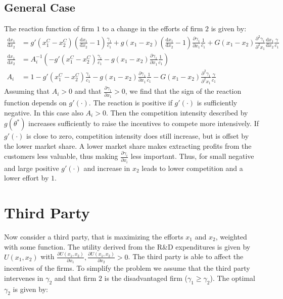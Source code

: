 \documentclass[a4paper, 11pt]{article}
\renewcommand{\d}{\text{d}}
\begin{document}
\subsection{General Case}
The reaction function of firm $1$ to a change in the efforts of firm $2$ is given by:
\begin{align}
\frac{\d x_1}{\d x_2} &= g'(x_1^C-x_2^C)\left(\frac{\d x_1}{\d x_2}-1\right)\frac{\gamma_1}{c_1} + g(x_1-x_2)\left(\frac{\d x_1}{\d x_2}-1\right)\frac{\partial \gamma_1}{\partial x_1}\frac{1}{c_1} + G(x_1-x_2)\frac{\partial^2 \gamma_1}{\partial^2 x_1}\frac{\d x_1}{\d x_2}\frac{\gamma}{c_1}\\
\frac{\d x_1}{\d x_2} &= A_i^{-1} \left(-g'(x_1^C-x_2^C)\frac{\gamma_1}{c_1} - g(x_1-x_2)\frac{\partial \gamma_1}{\partial x_1}\frac{1}{c_1}\right)\\
A_i &= 1 - g'(x_1^C-x_2^C)\frac{\gamma_1}{c_1}-g(x_1-x_2)\frac{\partial \gamma_1}{\partial x_1}\frac{1}{c_1}-G(x_1-x_2)\frac{\partial^2 \gamma_1}{\partial^2 x_1}\frac{\gamma}{c_1}
\end{align}
Assuming that $A_i>0$ and that $\frac{\partial \gamma_1}{\partial x_1}>0$, we find that the sign of the reaction function depends on $g'(\cdot)$. The reaction is positive if $g'(\cdot)$ is sufficiently negative. In this case also $A_i>0$. Then the competition intensity described by $g(\theta^*)$ increases sufficiently to raise the incentives to compete more intensively. If $g'(\cdot)$ is close to zero, competition intensity does still increase, but is offset by the lower market share. A lower market share makes extracting profits from the customers less valuable, thus making $\frac{\partial \gamma_i}{\partial x_i}$ less important. Thus, for small negative and large positive $g'(\cdot)$ and increase in $x_2$ leads to lower competition and a lower effort by $1$. %

\section{Third Party}

Now consider a third party, that is maximizing the efforts $x_1$ and $x_2$, weighted with some function. The utility derived from the R\&D expenditures is given by $U(x_1,x_2)$ with $\frac{\partial U(x_1,x_2)}{\partial x_1},\frac{\partial U(x_1,x_2)}{\partial x_2}>0$. The third party is able to affect the incentives of the firms. To simplify the problem we assume that the third party intervenes in $\gamma_2$ and that firm $2$ is the disadvantaged firm ($\gamma_1\geq\gamma_2$). The optimal $\gamma_2$ is given by:
\end{document}
